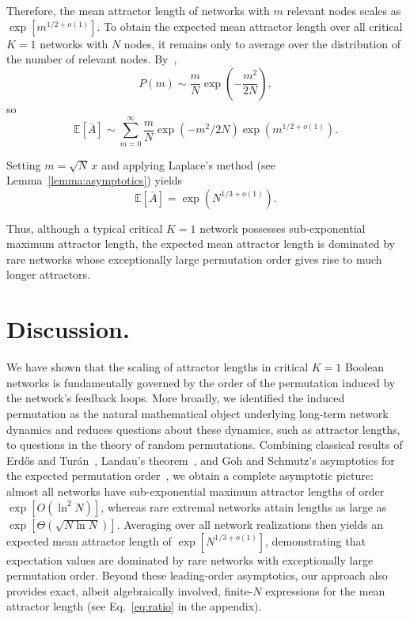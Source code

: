 \documentclass[11pt, reqno]{elsarticle}%
\theoremstyle{plain}
\begin{document}
Therefore, the mean attractor length of networks with $m$ relevant nodes scales as $\exp[m^{1/2+o(1)}]$. To obtain the expected mean attractor length over all critical $K=1$ networks with $N$ nodes, it remains only to average over the distribution of the number of relevant nodes. By~\cite{finkexponential,drosselreview},
\begin{equation}
P(m)\sim\frac{m}{N}\exp\!\left(-\frac{m^2}{2N}\right),
  \label{eq:Pm}
\end{equation}
so
\begin{equation}
  \label{eq:sum}
\mathbb E[\bar A] \sim \sum_{m=0}^{\infty} \frac{m}{N} 
\exp\!\left(-m^2/2N\right) 
\exp\!\left(m^{1/2+o(1)}\right).
\end{equation}

Setting $m=\sqrt N\,x$ and applying Laplace's method (see Lemma~\ref{lemma:asymptotics}) yields
\begin{equation}\label{eq:full_asymptotic}
\mathbb E[\bar A]
=
\exp\!\left(N^{1/3+o(1)}\right).
\end{equation}

Thus, although a typical critical $K=1$ network possesses sub-exponential
maximum attractor length, the expected mean attractor length is dominated by
rare networks whose exceptionally large permutation order gives rise to much
longer attractors.

\section*{Discussion.}
We have shown that the scaling of attractor lengths in
critical $K=1$ Boolean networks is fundamentally governed by the order of the permutation induced by the network's feedback loops. More broadly, we identified the induced permutation as the natural mathematical object underlying long-term network dynamics and reduces questions about these dynamics, such as attractor lengths, to questions in the theory of random permutations. Combining classical results of Erd\H{o}s and Tur\'an~\cite{ErdosTuran1965}, Landau's theorem~\cite{Landau1903}, and Goh and Schmutz's asymptotics for the expected permutation order~\cite{schmutz}, we obtain a complete asymptotic picture: almost all networks have sub-exponential maximum attractor lengths of order $\exp[O(\ln^2 N)]$, whereas rare extremal networks attain lengths as large as $\exp[\Theta(\sqrt{N\ln N})]$. Averaging over all network realizations then yields an expected mean attractor length of $\exp[N^{1/3+o(1)}]$, demonstrating that expectation values are dominated by rare networks with exceptionally large permutation order. Beyond these leading-order asymptotics, our approach also provides exact, albeit algebraically involved, finite-$N$ expressions for the mean attractor length (see Eq.~\ref{eq:ratio} in the appendix).
\end{document}
